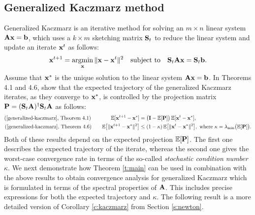 \documentclass{article}
\begin{document}
\subsection{Generalized Kaczmarz method}
Generalized Kaczmarz \cite{generalized-kaczmarz} is an iterative
method for solving an $m\times n$ linear system
$\A\x=\b$, which uses a $k\times m$ sketching matrix $\S_t$ to reduce
the linear system and update an iterate $\x^t$ as follows:
  \begin{align*}
    \x^{t+1} = \argmin_\x\|\x-\x^t\|^2\quad\textnormal{subject to}\quad\S_t\A\x=\S_t\b.
  \end{align*}
Assume that $\x^*$ is the unique solution to the linear system $\A\x=\b$. In Theorems 4.1 and 4.6, \cite{generalized-kaczmarz} show that the
expected trajectory of the generalized Kaczmarz iterates, as
they converge to $\x^*$, is controlled
by the projection matrix $\P=(\S_t\A)^\dagger\S_t\A$ as follows:
\begin{align*}
  \text{(\cite{generalized-kaczmarz}, Theorem 4.1)}\qquad\quad \ \ \,
  \E[\x^{t+1}-\x^*]
  &= \big(\I-\E[\P]\big)\,\E[\x^t-\x^*],\\
  \text{(\cite{generalized-kaczmarz}, Theorem 4.6)}\qquad
  \E\big[\|\x^{t+1}-\x^*\|^2\big]
&\leq (1-\kappa)\,\E\big[\|\x^t-\x^*\|^2\big],
\text{ where }\kappa=\lambda_{\min}\big(\E[\P]\big).
\end{align*}
Both of these results depend on the expected projection
$\E[\P]$. The first one describes the expected trajectory of the
iterate, whereas the second one gives the worst-case convergence
rate in terms of the so-called \emph{stochastic condition number}
$\kappa$. We next demonstrate how Theorem \ref{t:main} can be used  in 
combination with the above results to
obtain convergence analysis for generalized Kaczmarz which is
formulated in terms of the spectral properties of $\A$. This includes
precise expressions for both the expected trajectory and $\kappa$. The following
result is a more detailed version of Corollary \ref{c:kaczmarz} from
Section \ref{s:newton}.
\end{document}
